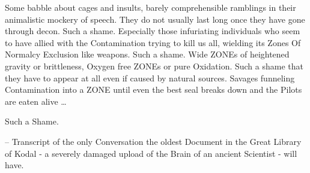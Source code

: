 Some babble about cages and insults, barely comprehensible ramblings in their animalistic mockery of
speech.
They do not usually last long once they have gone through decon.
Such a shame.
Especially those infuriating individuals who seem to have allied with the Contamination trying to kill us all,
wielding its Zones Of Normalcy Exclusion like weapons.
Such a shame.
Wide ZONEs of heightened gravity or brittleness, Oxygen free ZONEs or pure Oxidation.
Such a shame that they have to appear at all even if caused by natural sources.
Savages funneling Contamination into a ZONE  until even the best seal breaks down and the Pilots are eaten alive
\ldots \par Such a Shame. \par \par
-- Transcript of the only Conversation the oldest Document in the Great Library of Kodal - a severely damaged
upload of the Brain of an ancient Scientist - will have.\newpage
